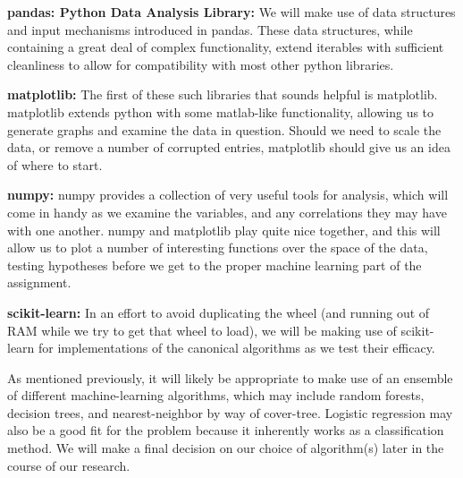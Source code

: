 \documentclass[12pt,a4paper]{article}
\begin{document}
\textbf{pandas: Python Data Analysis Library:}
We will make use of data structures and input mechanisms introduced in 
pandas.  These data structures, while containing a great deal of 
complex functionality, extend iterables with sufficient cleanliness to 
allow for compatibility with most other python libraries.

\textbf{matplotlib:} 
The first of these such libraries that sounds helpful is matplotlib.  
matplotlib extends python with some matlab-like functionality, allowing 
us to generate graphs and examine the data in question.  Should we need 
to scale the data, or remove a number of corrupted entries, matplotlib 
should give us an idea of where to start.

\textbf{numpy:}
numpy provides a collection of very useful tools for analysis, which 
will come in handy as we examine the variables, and any correlations 
they may have with one another.  numpy and matplotlib play quite nice 
together, and this will allow us to plot a number of interesting 
functions over the space of the data, testing hypotheses before we get 
to the proper machine learning part of the assignment.

\textbf{scikit-learn:}
In an effort to avoid duplicating the wheel (and running out of RAM 
while we try to get that wheel to load), we will be making use of 
scikit-learn for implementations of the canonical algorithms as we test 
their efficacy.

As mentioned previously, it will likely be appropriate to make use of an ensemble of different
machine-learning algorithms, which may include random forests, decision trees,
and nearest-neighbor by way of cover-tree. Logistic regression may also
be a good fit for the problem because it inherently works as a classification method.
We will make a final decision on our choice of algorithm(s) later in 
the course of our research.  
\end{document}
